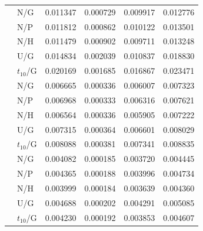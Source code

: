 \begin{table}[H]
\begin{tabular}{@{}rlrrrr@{}}
\addlinespace[3pt]
1024 & N/G & 0.011347 & 0.000729 & 0.009917 & 0.012776\\
 & N/P & 0.011812 & 0.000862 & 0.010122 & 0.013501\\
 & N/H & 0.011479 & 0.000902 & 0.009711 & 0.013248\\
 & U/G & 0.014834 & 0.002039 & 0.010837 & 0.018830\\
 & $t_{10}$/G & 0.020169 & 0.001685 & 0.016867 & 0.023471\\
\addlinespace[3pt]
2048 & N/G & 0.006665 & 0.000336 & 0.006007 & 0.007323\\
 & N/P & 0.006968 & 0.000333 & 0.006316 & 0.007621\\
 & N/H & 0.006564 & 0.000336 & 0.005905 & 0.007222\\
 & U/G & 0.007315 & 0.000364 & 0.006601 & 0.008029\\
 & $t_{10}$/G & 0.008088 & 0.000381 & 0.007341 & 0.008835\\
\addlinespace[3pt]
4096 & N/G & 0.004082 & 0.000185 & 0.003720 & 0.004445\\
 & N/P & 0.004365 & 0.000188 & 0.003996 & 0.004734\\
 & N/H & 0.003999 & 0.000184 & 0.003639 & 0.004360\\
 & U/G & 0.004688 & 0.000202 & 0.004291 & 0.005085\\
 & $t_{10}$/G & 0.004230 & 0.000192 & 0.003853 & 0.004607\\
\bottomrule
\end{tabular}
\end{table}
